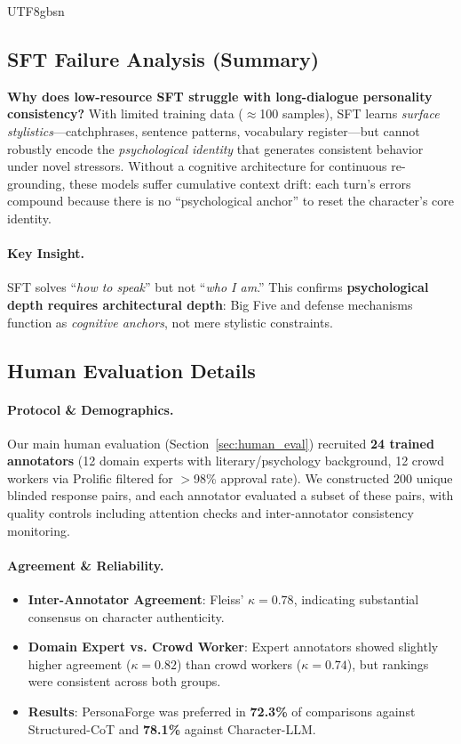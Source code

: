 \documentclass[11pt]{article}
\begin{document}
\begin{CJK*}{UTF8}{gbsn}
\subsection{SFT Failure Analysis (Summary)}
\label{sec:sft_short_analysis}

\textbf{Why does low-resource SFT struggle with long-dialogue personality consistency?} With limited training data ($\approx$100 samples), SFT learns \textit{surface stylistics}---catchphrases, sentence patterns, vocabulary register---but cannot robustly encode the \textit{psychological identity} that generates consistent behavior under novel stressors. Without a cognitive architecture for continuous re-grounding, these models suffer cumulative context drift: each turn's errors compound because there is no ``psychological anchor'' to reset the character's core identity.

\paragraph{Key Insight.} SFT solves ``\textit{how to speak}'' but not ``\textit{who I am}.'' This confirms \textbf{psychological depth requires architectural depth}: Big Five and defense mechanisms function as \textit{cognitive anchors}, not mere stylistic constraints.

\subsection{Human Evaluation Details}
\label{sec:human_eval_details}

\paragraph{Protocol \& Demographics.} Our main human evaluation (Section~\ref{sec:human_eval}) recruited \textbf{24 trained annotators} (12 domain experts with literary/psychology background, 12 crowd workers via Prolific filtered for $>$98\% approval rate). We constructed 200 unique blinded response pairs, and each annotator evaluated a subset of these pairs, with quality controls including attention checks and inter-annotator consistency monitoring.

\paragraph{Agreement \& Reliability.}
\begin{itemize}
    \item \textbf{Inter-Annotator Agreement}: Fleiss' $\kappa = 0.78$, indicating substantial consensus on character authenticity.
    \item \textbf{Domain Expert vs. Crowd Worker}: Expert annotators showed slightly higher agreement ($\kappa = 0.82$) than crowd workers ($\kappa = 0.74$), but rankings were consistent across both groups.
    \item \textbf{Results}: PersonaForge was preferred in \textbf{72.3\%} of comparisons against Structured-CoT and \textbf{78.1\%} against Character-LLM.
\end{itemize}


\end{CJK*}
\end{document}
